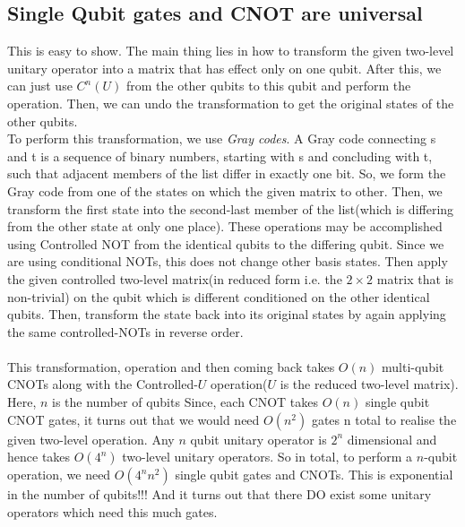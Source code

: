 \subsection{Single Qubit gates and CNOT are universal}
This is easy to show. The main thing lies in how to transform the given two-level unitary operator into a matrix that has effect only on one qubit. After this, we can just use $C^n(U)$ from the other qubits to this qubit and perform the operation. Then, we can undo the transformation to get the original states of the other qubits.\\
To perform this transformation, we use {\it Gray codes}. A Gray code connecting s and t is a sequence of binary numbers, starting with s and concluding with t, such that adjacent members of the list differ in exactly one bit. So, we form the Gray code from one of the states on which the given matrix to other. Then, we transform the first state into the second-last member of the list(which is differing from the other state at only one place). These operations may be accomplished using Controlled NOT from the identical qubits to the differing qubit. Since we are using conditional NOTs, this does not change other basis states. Then apply the given controlled two-level matrix(in reduced form i.e. the {$2 \times 2$} matrix that is non-trivial) on the qubit which is different conditioned on the other identical qubits. Then, transform the state back into its original states by again applying the same controlled-NOTs in reverse order.\\\\
This transformation, operation and then coming back takes $O(n)$ multi-qubit CNOTs along with the Controlled-$U$ operation($U$ is the reduced two-level matrix). Here, $n$ is the number of qubits Since, each CNOT takes $O(n)$ single qubit CNOT gates, it turns out that we would need $O(n^2) $ gates n total to realise the given two-level operation. Any $n$ qubit unitary operator  is $2^n$ dimensional and hence takes $O(4^n)$ two-level unitary operators. So in total, to perform a $n$-qubit operation, we need $O(4^n n^2)$ single qubit gates and CNOTs. This is exponential in the number of qubits!!! And it turns out that there DO exist some unitary operators which need this much gates. 
\\
